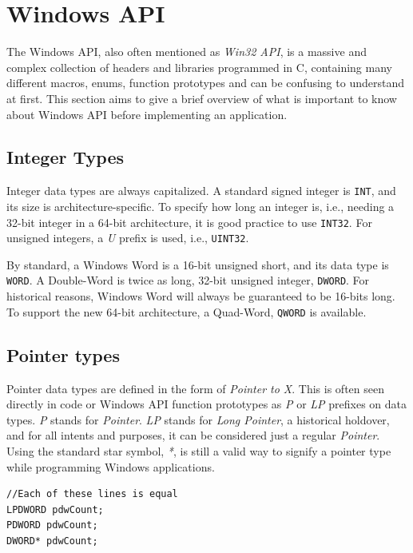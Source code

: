\section{Windows API}
The Windows API, also often mentioned as \textit{Win32 API}, is a massive and complex collection of headers and libraries programmed in C, containing many different macros, enums, function prototypes and can be confusing to understand at first. This section aims to give a brief overview of what is important to know about Windows API before implementing an application.

\subsection*{Integer Types}
\label{winIntegers}
Integer data types are always capitalized. A standard signed integer is \lstinline{INT}, and its size is architecture-specific. To specify how long an integer is, i.e., needing a 32-bit integer in a 64-bit architecture, it is good practice to use \lstinline{INT32}. For unsigned integers, a \textit{U} prefix is used, i.e., \lstinline{UINT32}.

By standard, a Windows Word is a 16-bit unsigned short, and its data type is \lstinline{WORD}. A Double-Word is twice as long, 32-bit unsigned integer,  \lstinline{DWORD}. For historical reasons, Windows Word will always be guaranteed to be 16-bits long. To support the new 64-bit architecture, a Quad-Word, \lstinline{QWORD} is available.

\subsection*{Pointer types}
Pointer data types are defined in the form of \textit{Pointer to X}. This is often seen directly in code or Windows API function prototypes as \textit{P} or \textit{LP} prefixes on data types. \textit{P} stands for \textit{Pointer}. \textit{LP} stands for \textit{Long Pointer}, a historical holdover, and for all intents and purposes, it can be considered just a regular \textit{Pointer}. Using the standard star symbol, \textit{*}, is still a valid way to signify a pointer type while programming Windows applications.

\begin{lstlisting}[caption={An example of declaring a pointer to a double-word}]
//Each of these lines is equal
LPDWORD pdwCount;
PDWORD pdwCount;
DWORD* pdwCount;
\end{lstlisting}

